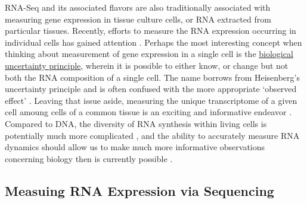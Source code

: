 
RNA-Seq and its associated flavors are also traditionally associated with measuring gene expression in tissue culture cells, or RNA extracted from particular tissues. Recently, efforts to measure the RNA expression occurring in individual cells has gained attention \citep{Shapiro2013b}. Perhaps the most interesting concept when thinking about measurement of gene expression in a single cell is the \underline{biological uncertainty principle}, wherein it is possible to either know, or change \textemdash but not both \textemdash the RNA composition of a single cell. The name borrows from Heisenberg's uncertainty principle \citep{Kennard1927} and is often confused with the more appropriate ‘observed effect’ \citep{Riley2013}. Leaving that issue aside, measuring the unique transcriptome of a given cell amoung cells of a common tissue is an exciting and informative endeavor \citep{Shalek2013b,Wills2013}. Compared to DNA, the diversity of RNA synthesis within living cells is potentially much more complicated \citep{Shendure2012}, and the ability to accurately measure RNA dynamics should allow us to make much more informative observations concerning biology then is currently possible \citep{Djebali2012}.


\subsection{Measuing RNA Expression via Sequencing}

